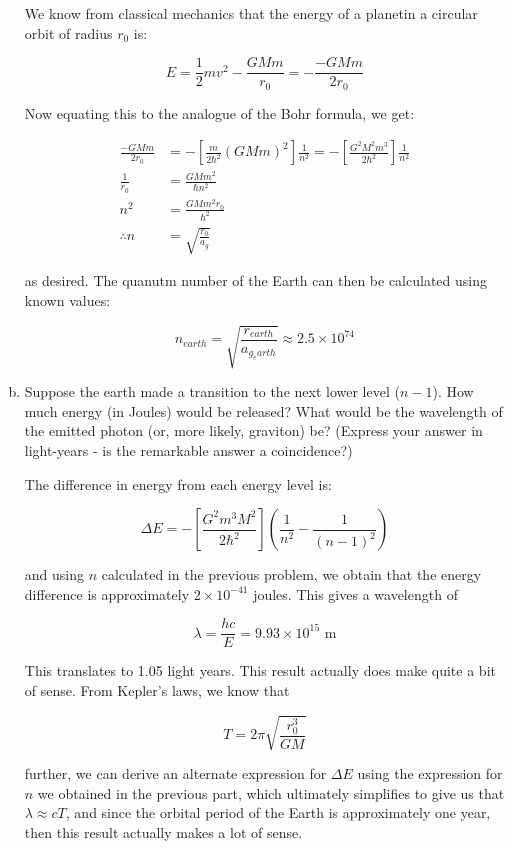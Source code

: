 \documentclass[10pt]{article}
\begin{document}
\begin{enumerate}[(a)]
\begin{solution}
            We know from classical mechanics that the energy of a planetin a circular orbit of radius $r_0$ is: 

            \[ E = \frac{1}{2} mv^2 - \frac{GMm}{r_0} = -\frac{-GMm}{2r_0}\] 

            Now equating this to the analogue of the Bohr formula, we get: 

            \begin{align*}
                \frac{-GMm}{2r_0} &= -\left[ \frac{m}{2\hbar^2}(GMm)^2\right] \frac{1}{n^2} = -\left[\frac{G^2M^2m^3}{2\hbar^2}\right] \frac{1}{n^2}\\
                \frac{1}{r_0} &= \frac{GMm^2}{\hbar n^2} \\
                n^2 &= \frac{GMm^2r_0}{\hbar^2}\\
                \therefore n &= \sqrt{\frac{r_0}{a_g}}
            \end{align*}

            as desired. The quanutm number of the Earth can then be calculated using known values: 

            \[ n_{earth} = \sqrt{\frac{r_{earth}}{a_{g_earth}}} \approx 2.5 \times 10^{74}\] 
        \end{solution}
        \item Suppose the earth made a transition to the next lower level ($n-1$). How much energy (in Joules) would be released? What would be the wavelength of the emitted photon (or, more likely, graviton) be? (Express your answer in light-years - is the remarkable answer a coincidence?)
        
        \begin{solution}
            The difference in energy from each energy level is: 

            \[ \Delta E = -\left[\frac{G^2m^3M^2}{2\hbar^2}\right]\left(\frac{1}{n^2} - \frac{1}{(n-1)^2}\right)\] 
            
            and using $n$ calculated in the previous problem, we obtain that the energy difference is approximately $2 \times 10^{-41}$ joules. This gives a wavelength of 

            \[ \lambda = \frac{hc}{E} = 9.93 \times 10^{15} \text{ m}\] 

            This translates to 1.05 light years. This result actually does make quite a bit of sense. From Kepler's laws, we know that 

            \[ T = 2\pi \sqrt{\frac{r_0^3}{GM}}\] 

            further, we can derive an alternate expression for $\Delta E$ using the expression for $n$ we obtained in the previous part, which ultimately simplifies to give us that $\lambda \approx cT$, and since the orbital period of the Earth is approximately one year, then this result actually makes a lot of sense.
        \end{solution}
    \end{enumerate}
\end{document}
